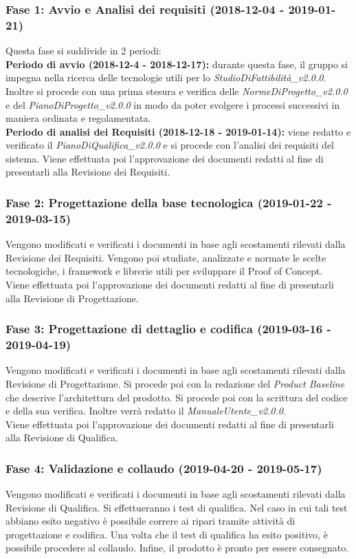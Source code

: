 \subsubsection{Fase 1: Avvio e Analisi dei requisiti (2018-12-04 - 2019-01-21)} 
Questa fase si suddivide in 2 periodi: \\
\textbf{Periodo di avvio (2018-12-4 - 2018-12-17):} 
durante questa fase, il gruppo si impegna nella ricerca delle tecnologie utili per lo \textit{StudioDiFattibilità\_v2.0.0}. Inoltre si procede con una prima stesura e verifica delle \textit{NormeDiProgetto\_v2.0.0} e del \textit{PianoDiProgetto\_v2.0.0} in modo da poter svolgere i processi successivi in maniera ordinata e regolamentata.\\
\textbf{Periodo di analisi dei Requisiti (2018-12-18 - 2019-01-14):} viene redatto e verificato il \textit{PianoDiQualifica\_v2.0.0} e si procede con l'analisi dei requisiti del sistema.
Viene effettuata poi l'approvazione dei documenti redatti al fine di presentarli alla Revisione dei Requisiti.
\subsubsection{Fase 2: Progettazione della base tecnologica (2019-01-22 - 2019-03-15)}
Vengono modificati e verificati i documenti in base agli scostamenti rilevati dalla Revisione dei Requisiti.
Vengono poi studiate, analizzate e normate le scelte tecnologiche, i framework e librerie utili per sviluppare il Proof of Concept.\\
Viene effettuata poi l'approvazione dei documenti redatti al fine di presentarli alla Revisione di Progettazione.

\subsubsection{Fase 3: Progettazione di dettaglio e codifica (2019-03-16 - 2019-04-19)}
Vengono modificati e verificati i documenti in base agli scostamenti rilevati dalla Revisione di Progettazione.
Si procede poi con la redazione del \textit{Product Baseline} che descrive l'architettura del prodotto.
Si procede poi con la scrittura del codice e della sua verifica.
Inoltre verrà redatto il \textit{ManualeUtente\_v2.0.0}.\\
Viene effettuata poi l'approvazione dei documenti redatti al fine di presentarli alla Revisione di Qualifica.
\subsubsection{Fase 4: Validazione e collaudo (2019-04-20 - 2019-05-17)}
Vengono modificati e verificati i documenti in base agli scostamenti rilevati dalla Revisione di Qualifica.
Si effettueranno i test di qualifica. Nel caso in cui tali test abbiano esito negativo è possibile correre ai ripari tramite attività di progettazione e codifica. Una volta che il test di qualifica ha esito positivo, è possibile procedere al collaudo.
Infine, il prodotto è pronto per essere consegnato.

